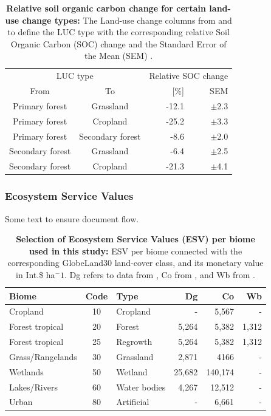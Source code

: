 			\begin{table}[ht]
				\centering
				\caption[Relative soil organic carbon change for certain land-use change types]{\textbf{Relative soil organic carbon change for certain land-use change types:} The Land-use change columns from and to define the LUC type with the corresponding relative Soil Organic Carbon (SOC) change and the Standard Error of the Mean (SEM) \citep{Don2010}.}
				\label{tab:soc}
				\begin{tabular}{ccrr}
					\hline
					\multicolumn{2}{c}{LUC type} & \multicolumn{2}{c}{Relative SOC change} \\
					From & To & [\%] & SEM \\\hline
					Primary forest & Grassland & -12.1 & $\pm$2.3 \\
					Primary forest & Cropland & -25.2 & $\pm$3.3 \\
					Primary forest & Secondary forest & -8.6 & $\pm$2.0 \\
					Secondary forest & Grassland & -6.4 & $\pm$2.5 \\
					Secondary forest & Cropland & -21.3 & $\pm$4.1 \\\hline
				\end{tabular}
			\end{table}

		\subsubsection{Ecosystem Service Values}
			Some text to ensure document flow.
			\begin{table}[ht]
				\centering
				\caption[Selection of Ecosystem Service Values (ESV) used in this study]{\textbf{Selection of Ecosystem Service Values (ESV) per biome used in this study:} ESV per biome connected with the corresponding GlobeLand30 land-cover class, and its monetary value in Int.\$ ha$^-1$. Dg refers to data from \citeauthor{Groot2012}, Co from \citeauthor{Costanza2014}, and Wb from \citeauthor{Siikamaki2015}.\citep{Groot2012,Costanza2014,Siikamaki2015}}
				\label{tab:esv}
				\begin{tabular}{lclrrr}
					\hline
					Biome & Code & Type & Dg & Co & Wb \\\hline
					Cropland & 10 & Cropland & - & 5,567 & -\\
					Forest tropical & 20 & Forest & 5,264 & 5,382 & 1,312\\
					Forest tropical & 25 & Regrowth & 5,264 & 5,382 & 1,312\\
					Grass/Rangelands & 30 & Grassland & 2,871 & 4166 & -\\
					Wetlands & 50 & Wetland & 25,682 & 140,174 & -\\
					Lakes/Rivers & 60 & Water bodies & 4,267 & 12,512 & -\\
					Urban & 80 & Artificial & - & 6,661 & -\\\hline
				\end{tabular}
			\end{table}

